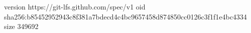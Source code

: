 version https://git-lfs.github.com/spec/v1
oid sha256:b85452952943c8f381a7bdecd4c4bc9657458d874850cc0126c3f1f1e4bc4334
size 349692
